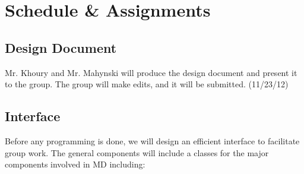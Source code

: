 \documentclass[10pt]{article}
\begin{document}

\section{Schedule \& Assignments}
\subsection{Design Document}
Mr. Khoury and Mr. Mahynski will produce the design document and present it to the group. The group will make edits, and it will be submitted. (11/23/12)

\subsection{Interface}
Before any programming is done, we will design an efficient interface to facilitate group work. The general components will include a classes for the major components involved in MD including:
\end{document}

